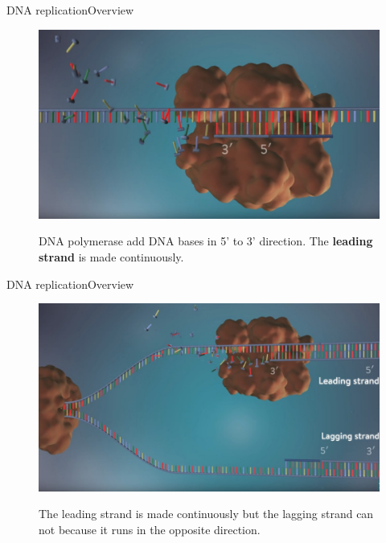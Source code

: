 \documentclass[10pt]{beamer}
\begin{document}
{%
\begin{frame}{DNA replication}{Overview}
	\begin{figure}[]
		\centering
		\includegraphics[width=\textwidth,height=0.6\textheight,keepaspectratio]{img/introduction/dna37.jpg}
		\label{img:mot2}
		\caption{DNA polymerase add DNA bases in 5' to 3' direction. The \textbf{leading strand} is made continuously.}
	\end{figure}
\end{frame}


\begin{frame}{DNA replication}{Overview}
	\begin{figure}[]
		\centering
		\includegraphics[width=\textwidth,height=0.6\textheight,keepaspectratio]{img/introduction/dna38.jpg}
		\label{img:mot2}
		\caption{The leading strand is made continuously but the lagging strand can not because it runs in the opposite direction.}
	\end{figure}
\end{frame}


}
\end{document}
